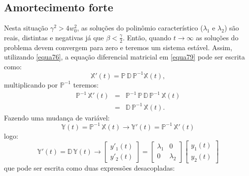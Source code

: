 \documentclass[12pt,openright,twoside,english,brazil]{abntex2}
\begin{document}
\subsection{Amortecimento forte}
Nesta situação $\gamma^2 > 4 w_0^2$, as soluções do polinômio característico ($\lambda_1$ e $\lambda_2$) são reais, distintas e negativas já que $\beta < \frac{\gamma}{2}$. Então, quando $t\rightarrow \infty$ as soluções do problema devem convergem para zero e teremos um sistema estável. Assim, utilizando \ref{equa76}, a equação diferencial matricial em \ref{equa79} pode ser escrita como:
\begin{equation}
 \mathbb{X}'(t) = \mathbb{P}\, \mathbb{D}\, \mathbb{P}^{-1} \mathbb{X}(t),
 \label{equa86}
\end{equation}
multiplicando por $\mathbb{P}^{-1}$ teremos:
\begin{eqnarray}
 \mathbb{P}^{-1}\, \mathbb{X}'(t) & = & \mathbb{P}^{-1}\, \mathbb{P}\, \mathbb{D}\, \mathbb{P}^{-1}\, \mathbb{X}(t) \nonumber \\
                & = & \mathbb{D}\, \mathbb{P}^{-1}\, \mathbb{X}(t).
 \label{equa87}
\end{eqnarray}
Fazendo uma mudança de variável:
\begin{equation}
 \mathbb{Y}(t) = \mathbb{P}^{-1}\, \mathbb{X}(t) \rightarrow \mathbb{Y}'(t) = \mathbb{P}^{-1}\, \mathbb{X}'(t)
 \label{equa88}
\end{equation}
logo:
\begin{equation}
 \mathbb{Y}'(t) = \mathbb{D}\, \mathbb{Y}(t)\rightarrow \begin{bmatrix}
                              y'_1(t) \\
                              y'_2(t)
                              \end{bmatrix} = \begin{bmatrix}
                                               \lambda_1 & 0 \\
                                               0 & \lambda_2
                                               \end{bmatrix} \begin{bmatrix}
                                                y_1(t) \\
                                                y_2(t)
                                               \end{bmatrix}
 \label{equa89}
\end{equation}
que pode ser escrita como duas expressões desacopladas:
\end{document}
